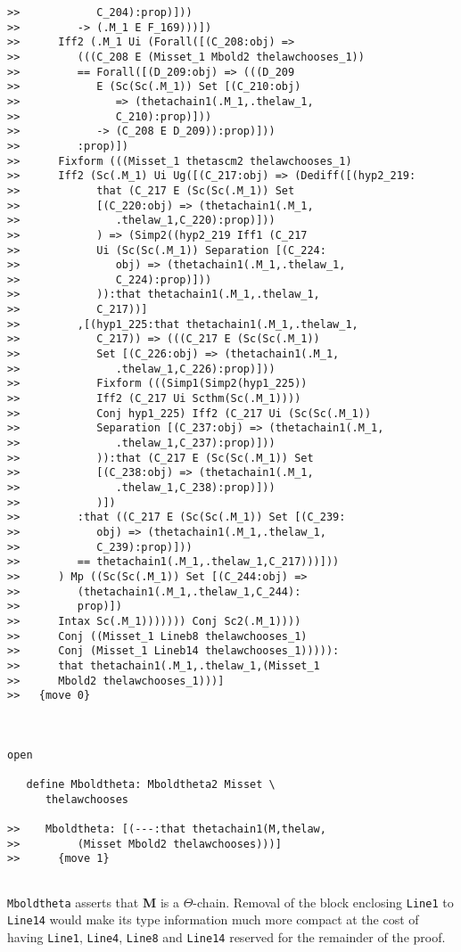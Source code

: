 \documentclass[12pt]{article}
\begin{document}
\begin{verbatim}
>>            C_204):prop)]))
>>         -> (.M_1 E F_169)))])
>>      Iff2 (.M_1 Ui (Forall([(C_208:obj) =>
>>         (((C_208 E (Misset_1 Mbold2 thelawchooses_1))
>>         == Forall([(D_209:obj) => (((D_209
>>            E (Sc(Sc(.M_1)) Set [(C_210:obj)
>>               => (thetachain1(.M_1,.thelaw_1,
>>               C_210):prop)]))
>>            -> (C_208 E D_209)):prop)]))
>>         :prop)])
>>      Fixform (((Misset_1 thetascm2 thelawchooses_1)
>>      Iff2 (Sc(.M_1) Ui Ug([(C_217:obj) => (Dediff([(hyp2_219:
>>            that (C_217 E (Sc(Sc(.M_1)) Set
>>            [(C_220:obj) => (thetachain1(.M_1,
>>               .thelaw_1,C_220):prop)]))
>>            ) => (Simp2((hyp2_219 Iff1 (C_217
>>            Ui (Sc(Sc(.M_1)) Separation [(C_224:
>>               obj) => (thetachain1(.M_1,.thelaw_1,
>>               C_224):prop)]))
>>            )):that thetachain1(.M_1,.thelaw_1,
>>            C_217))]
>>         ,[(hyp1_225:that thetachain1(.M_1,.thelaw_1,
>>            C_217)) => (((C_217 E (Sc(Sc(.M_1))
>>            Set [(C_226:obj) => (thetachain1(.M_1,
>>               .thelaw_1,C_226):prop)]))
>>            Fixform (((Simp1(Simp2(hyp1_225))
>>            Iff2 (C_217 Ui Scthm(Sc(.M_1))))
>>            Conj hyp1_225) Iff2 (C_217 Ui (Sc(Sc(.M_1))
>>            Separation [(C_237:obj) => (thetachain1(.M_1,
>>               .thelaw_1,C_237):prop)]))
>>            )):that (C_217 E (Sc(Sc(.M_1)) Set
>>            [(C_238:obj) => (thetachain1(.M_1,
>>               .thelaw_1,C_238):prop)]))
>>            )])
>>         :that ((C_217 E (Sc(Sc(.M_1)) Set [(C_239:
>>            obj) => (thetachain1(.M_1,.thelaw_1,
>>            C_239):prop)]))
>>         == thetachain1(.M_1,.thelaw_1,C_217)))]))
>>      ) Mp ((Sc(Sc(.M_1)) Set [(C_244:obj) =>
>>         (thetachain1(.M_1,.thelaw_1,C_244):
>>         prop)])
>>      Intax Sc(.M_1))))))) Conj Sc2(.M_1))))
>>      Conj ((Misset_1 Lineb8 thelawchooses_1)
>>      Conj (Misset_1 Lineb14 thelawchooses_1))))):
>>      that thetachain1(.M_1,.thelaw_1,(Misset_1
>>      Mbold2 thelawchooses_1)))]
>>   {move 0}



open

   define Mboldtheta: Mboldtheta2 Misset \
      thelawchooses

>>    Mboldtheta: [(---:that thetachain1(M,thelaw,
>>         (Misset Mbold2 thelawchooses)))]
>>      {move 1}


\end{verbatim}

{\tt Mboldtheta} asserts that {\bf M} is a $\Theta$-chain.  Removal of the block enclosing {\tt Line1} to {\tt Line14} would make its type information much more compact at the  cost
of having {\tt Line1}, {\tt Line4}, {\tt Line8} and {\tt Line14} reserved for the remainder of the proof.
\end{document}
